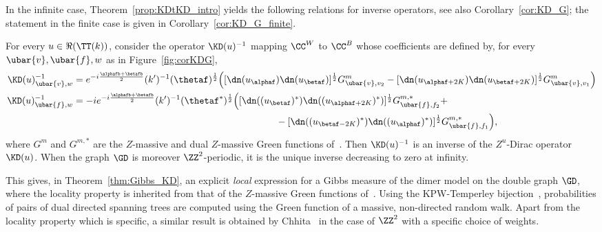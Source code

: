\documentclass[a4paper,twoside,11pt]{article}
\begin{document}
In the infinite case, Theorem~\ref{prop:KDtKD_intro} yields the following relations for inverse operators, see also Corollary~\ref{cor:KD_G};
the statement in the finite case is given in Corollary~\ref{cor:KD_G_finite}.
\begin{cor}\label{cor:KD_G_intro}
For every $u\in\Re(\TT(k))$, consider the operator $\KD(u)^{-1}$
mapping $\CC^{W}$ to $\CC^{B}$ whose coefficients are defined by, for every $\ubar{v},\ubar{f},w$ as in Figure~\ref{fig:corKDG},
\begin{align*}
\KD(u)^{-1}_{\ubar{v},w}&=e^{-i\frac{\alphafb+\betafb}{2}}(k')^{-1}\sc(\thetaf)^{\frac{1}{2}}
\Bigl([\dn(u_{\alphaf})\dn(u_{\betaf})]^{\frac{1}{2}} G^m_{\ubar{v},v_2}-[\dn(u_{\alphaf+2K})\dn(u_{\betaf+2K})]^{\frac{1}{2}}G^m_{\ubar{v},v_1}\Bigr)\\
\KD(u)^{-1}_{\ubar{f},w}&=-ie^{-i\frac{\alphafb+\betafb}{2}}(k')^{-1}\sc(\thetaf^*)^{\frac{1}{2}}
\Bigl([\dn((u_{\betaf})^*)\dn((u_{\alphaf+2K})^*)]^{\frac{1}{2}}G^{m,*}_{\ubar{f},f_2}+\\
&\hspace{7.5cm} -[\dn((u_{\betaf-2K})^*)\dn((u_{\alphaf})^*)]^{\frac{1}{2}}G^{m,*}_{\ubar{f},f_1} \Bigr),
\end{align*}
where $G^m$ and $G^{m,*}$ are the $Z$-massive and dual $Z$-massive Green functions of~\cite{BdTR1}.
Then $\KD(u)^{-1}$ is an inverse of the $Z^u$-Dirac operator $\KD(u)$. When the graph $\GD$ is moreover $\ZZ^2$-periodic, it is 
the unique inverse decreasing to zero at infinity.
\end{cor}
This gives, in Theorem~\ref{thm:Gibbs_KD}, an explicit \emph{local} expression for a Gibbs measure of the dimer model on the double graph
$\GD$, where the locality property is inherited from that of the $Z$-massive Green functions of~\cite{BdTR1}. Using the KPW-Temperley
bijection~\cite{Temperley,KPW}, probabilities of pairs of dual directed spanning trees are computed using the Green function of 
a massive, non-directed random walk. Apart from the locality property which is specific,
a similar result is obtained by Chhita~\cite{Chhita} in the case of $\ZZ^2$ with a specific choice of weights.
\end{document}

